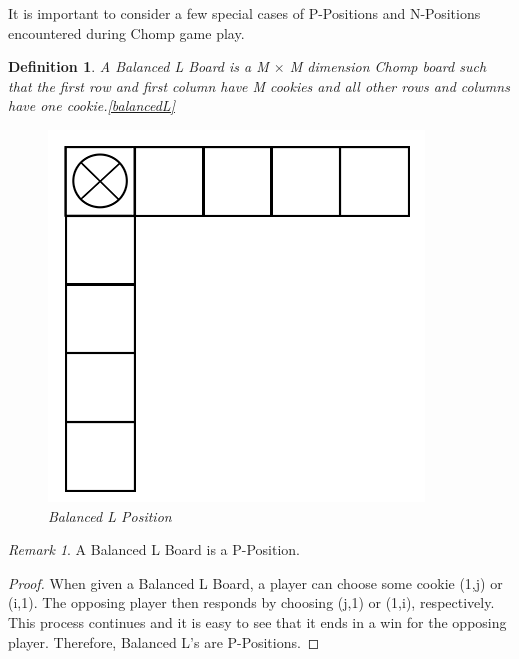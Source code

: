 \documentclass{amsart}
\newtheorem{term}{Definition} %
\theoremstyle{definition}
\theoremstyle{remark}
\newtheorem{rem}[thm]{Remark}
\numberwithin{equation}{section}
\begin{document}
\noindent It is important to consider a few special cases of P-Positions and N-Positions encountered during Chomp game play. \\

\begin{term}
A Balanced L Board is a M $\times$ M dimension Chomp board such that the first row and first column have M cookies and all other rows and columns have one cookie.\ref{balancedL} 
\begin{figure}[balancedL]
\includegraphics[scale=0.25]{Images/balancedL.png}
\caption{Balanced L Position}
\end{figure}
\end{term}

\begin{rem}
A Balanced L Board is a P-Position.
\end{rem}
\begin{proof}
When given a Balanced L Board, a player can choose some cookie (1,j) or (i,1). The opposing player then responds by choosing (j,1) or (1,i), respectively. This process continues and it is easy to see that it ends in a win for the opposing player. Therefore, Balanced L's are P-Positions.  
\end{proof}
\end{document}
